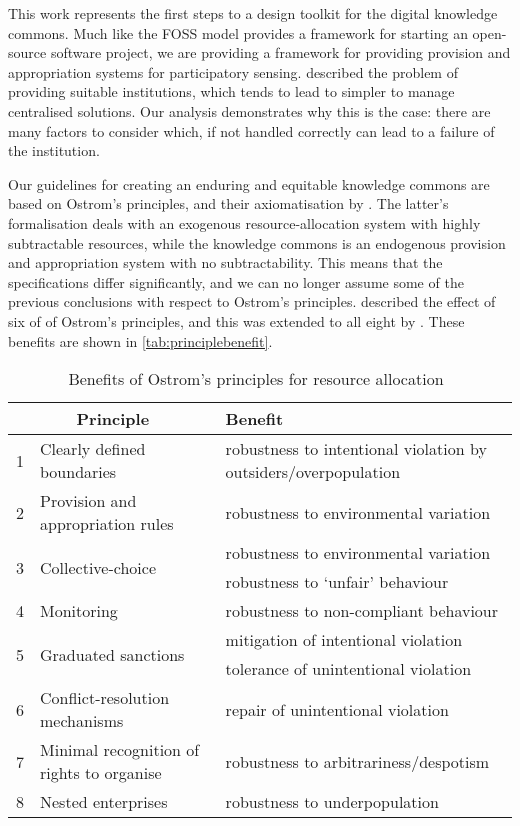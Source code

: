 This work represents the first steps to a design toolkit for the digital
knowledge commons. Much like the \ac{FOSS} model provides a framework for
starting an open-source software project, we are providing a framework for
providing provision and appropriation systems for participatory sensing.
\citet{Ostrom1990} described the problem of providing suitable institutions,
which tends to lead to simpler to manage centralised solutions. Our analysis
demonstrates why this is the case: there are many factors to consider which,
if not handled correctly can lead to a failure of the institution.

Our guidelines for creating an enduring and equitable knowledge commons are
based on Ostrom's principles, and their axiomatisation by \citet{Pitt2012b}.
The latter's formalisation deals with an exogenous resource-allocation system
with highly subtractable resources, while the knowledge commons is an
endogenous provision and appropriation system with no subtractability. This
means that the specifications differ significantly, and we can no longer
assume some of the previous conclusions with respect to Ostrom's principles.
\citet{Pitt2012b} described the effect of six of of Ostrom's principles, and this was extended to all eight by \citet{Schaumeier2013}. These benefits are shown in \autoref{tab:principlebenefit}.

\begin{table}[ht]
\centering
\caption[Benefits of Ostrom's principles for resource allocation]{Benefits of Ostrom's principles for resource allocation~\citep{Schaumeier2013}}\label{tab:principlebenefit}
\begin{tabularx}{\textwidth}{lp{4cm}X}
\multicolumn{2}{c}{Principle} & Benefit \\
\hline
1 & Clearly defined boundaries & robustness to intentional violation by outsiders/overpopulation \\
2 & Provision and appropriation rules & robustness to environmental variation \\
\multirow{2}{*}{3} & \multirow{2}{*}{Collective-choice} & robustness to environmental variation \\
 & & robustness to `unfair' behaviour \\
4 & Monitoring & robustness to non-compliant behaviour \\
\multirow{2}{*}{5} & \multirow{2}{*}{Graduated sanctions} & mitigation of intentional violation \\
 & & tolerance of unintentional violation \\
6 & Conflict-resolution mechanisms & repair of unintentional violation \\
7 & Minimal recognition of rights to organise & robustness to arbitrariness/despotism \\
8 & Nested enterprises & robustness to underpopulation \\
\end{tabularx}
\end{table}

